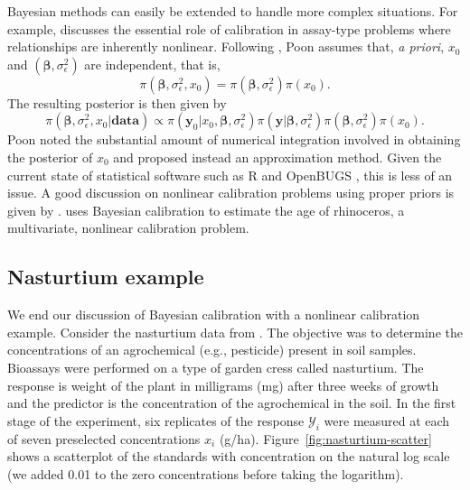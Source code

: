 \documentclass[cmfont,usenames,dvipsnames,leqno]{afit-etd}\usepackage[]{graphicx}\usepackage[]{color}
\newcommand{\mc}[1]{\ensuremath{\mathcal{#1}}}
\begin{document}
Bayesian methods can easily be extended to handle more complex situations. For example, \citet{racine-poon_bayesian_1988} discusses the essential role of calibration in assay-type problems where relationships are inherently nonlinear. Following \citet{hoadley_bayesian_1970}, Poon assumes that, \textit{a priori}, $x_0$ and $(\bm{\beta}, \sigma_\epsilon^2)$ are independent, that is,
\begin{equation*}
  \pi\left(\bm{\beta}, \sigma_\epsilon^2, x_0\right) = \pi\left(\bm{\beta}, \sigma_\epsilon^2\right) \pi\left(x_0\right).
\end{equation*}
The resulting posterior is then given by
\begin{equation*}
  \pi\left(\bm{\beta}, \sigma_\epsilon^2, x_0|\mathbf{data}\right) \propto \pi\left(\bm{y}_0|x_0, \bm{\beta}, \sigma_\epsilon^2\right) \pi\left(\bm{y}|\bm{\beta}, \sigma_\epsilon^2\right) \pi\left(\bm{\beta}, \sigma_\epsilon^2\right) \pi\left(x_0\right).
\end{equation*}
Poon noted the substantial amount of numerical integration involved in obtaining the posterior of $x_0$ and proposed instead an approximation method. Given the current state of statistical software such as R \citep{rprogram} and OpenBUGS \citep{lunn_bugs_2009}, this is less of an issue. A good discussion on nonlinear calibration problems using proper priors is given by \citet{hamada_bayesian_2003}. \citet{plessis_bayesian_1996} uses Bayesian calibration to estimate the age of rhinoceros, a multivariate, nonlinear calibration problem. 

\subsection{Nasturtium example}
\label{sec:nasturtium}
We end our discussion of Bayesian calibration with a nonlinear calibration example. Consider the nasturtium data from \citet{racine-poon_bayesian_1988}. The objective was to determine the concentrations of an agrochemical (e.g., pesticide) present in soil samples. Bioassays were performed on a type of garden cress called nasturtium. The response is weight of the plant in milligrams (mg) after three weeks of growth and the predictor is the concentration of the agrochemical in the soil. In the first stage of the experiment, six replicates of the response $\mc{Y}_i$ were measured at each of seven preselected concentrations $x_i$ (g/ha). Figure~\ref{fig:nasturtium-scatter} shows a scatterplot of the standards with concentration on the natural log scale (we added 0.01 to the zero concentrations before taking the logarithm). 
\end{document}
